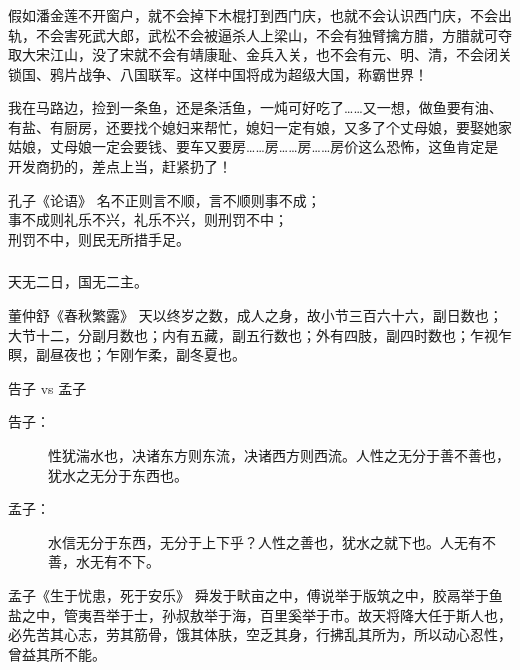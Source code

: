\documentclass[UTF8,11pt,colorlinks,compress,openany]{beamer}%
\begin{document}
\begin{frame}\frametitle{}
\begin{block}{}
假如潘金莲不开窗户，就不会掉下木棍打到西门庆，也就不会认识西门庆，不会出轨，不会害死武大郎，武松不会被逼杀人上梁山，不会有独臂擒方腊，方腊就可夺取大宋江山，没了宋就不会有靖康耻、金兵入关，也不会有元、明、清，不会闭关锁国、鸦片战争、八国联军。这样中国将成为超级大国，称霸世界！
\end{block}
\begin{block}{}
我在马路边，捡到一条鱼，还是条活鱼，一炖可好吃了……又一想，做鱼要有油、有盐、有厨房，还要找个媳妇来帮忙，媳妇一定有娘，又多了个丈母娘，要娶她家姑娘，丈母娘一定会要钱、要车又要房……房……房……房价这么恐怖，这鱼肯定是开发商扔的，差点上当，赶紧扔了！
\end{block}
\begin{block}{孔子《论语》}
名不正则言不顺，言不顺则事不成；\\
事不成则礼乐不兴，礼乐不兴，则刑罚不中；\\
刑罚不中，则民无所措手足。
\end{block}
\end{frame}

\begin{frame}\frametitle{}
\begin{block}{}
天无二日，国无二主。
\end{block}
\begin{block}{董仲舒《春秋繁露》}
天以终岁之数，成人之身，故小节三百六十六，副日数也；大节十二，分副月数也；内有五藏，副五行数也；外有四肢，副四时数也；乍视乍瞑，副昼夜也；乍刚乍柔，副冬夏也。
\end{block}
\begin{block}{告子 vs 孟子}
\begin{description}
\item[告子：] 性犹湍水也，决诸东方则东流，决诸西方则西流。人性之无分于善不善也，犹水之无分于东西也。
\item[孟子：] 水信无分于东西，无分于上下乎？人性之善也，犹水之就下也。人无有不善，水无有不下。
\end{description}
\end{block}
\begin{block}{孟子《生于忧患，死于安乐》}
舜发于畎亩之中，傅说举于版筑之中，胶鬲举于鱼盐之中，管夷吾举于士，孙叔敖举于海，百里奚举于市。故天将降大任于斯人也，必先苦其心志，劳其筋骨，饿其体肤，空乏其身，行拂乱其所为，所以动心忍性，曾益其所不能。
\end{block}
\end{frame}
\end{document}
